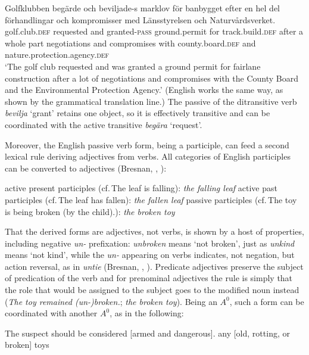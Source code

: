 \ea
\gll Golfklubben beg\"arde och beviljade-s marklov f\"or banbygget efter en hel del f\"orhandlingar och kompromisser med L\"ansstyrelsen och 
Naturv\aa rdsverket.\footnotemark\\
golf.club.\textsc{def} requested and granted-\textsc{pass} ground.permit for track.build.\textsc{def} after a whole part negotiations and compromises with county.board.\textsc{def} and nature.protection.agency.\textsc{def} \\
\glt `The golf club requested and was granted a ground permit for fairlane construction after a lot of negotiations and compromises with the County Board and the Environmental Protection Agency.'
\z
\noindent
(English works the same way, as shown by the grammatical translation line.)  
The passive of the ditransitive verb \emph{bevilja} `grant' retains one object, so it is effectively
transitive and can be coordinated with the active transitive \emph{beg\"ara} `request'. 

Moreover, the English passive verb form, being a participle, can feed a second lexical rule deriving
adjectives from verbs.  All categories of English participles can be converted to adjectives
(Bresnan, \citeyear{Bresnan82a}, \citeyear[Chapter~3]{Bresnan2001a}):

\eal
\ex active present participles (cf.\,The leaf is falling): \emph{the falling leaf} 
\ex active past participles (cf.\,The leaf has fallen): \emph{the fallen leaf} 
\ex passive participles (cf.\,The toy is being broken (by the child).): \emph{the broken toy} 
\zl

\noindent
That the derived forms are adjectives, not verbs, is shown by a host of properties, including
negative \emph{un-} prefixation: \emph{unbroken} means `not broken', just as \emph{unkind} means
`not kind', while the \emph{un-} appearing on verbs indicates, not negation, but action reversal, as
in \emph{untie} (Bresnan, \citeyear[]{Bresnan82a}, \citeyear[Chapter~3]{Bresnan2001a}).  Predicate adjectives preserve the subject of predication of the verb and for
prenominal adjectives the rule is simply that the role that would be assigned to the subject goes to
the modified noun instead (\emph{The toy remained (un-)broken.}; \emph{the broken toy}).  Being an
$A^0$, such a form can be coordinated with another $A^0$, as in the following:

\eal
\ex The suspect should be considered [armed and dangerous].
\ex any [old, rotting, or broken] toys
\zl

